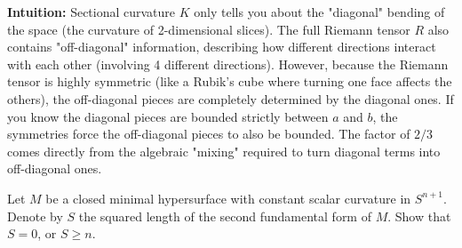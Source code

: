\begin{solution}
\textbf{Intuition:}
Sectional curvature $K$ only tells you about the "diagonal" bending of the space (the curvature of 2-dimensional slices). The full Riemann tensor $R$ also contains "off-diagonal" information, describing how different directions interact with each other (involving 4 different directions). However, because the Riemann tensor is highly symmetric (like a Rubik's cube where turning one face affects the others), the off-diagonal pieces are completely determined by the diagonal ones. If you know the diagonal pieces are bounded strictly between $a$ and $b$, the symmetries force the off-diagonal pieces to also be bounded. The factor of $2/3$ comes directly from the algebraic "mixing" required to turn diagonal terms into off-diagonal ones.
\end{solution}

\begin{exercise}
\label{geometry:2016:12}
Let $M$ be a closed minimal hypersurface with constant scalar curvature in $S^{n+1}$. Denote by $S$ the squared length of the second fundamental form of $M$. Show that $S = 0$, or $S \geq n$.
\end{exercise}

